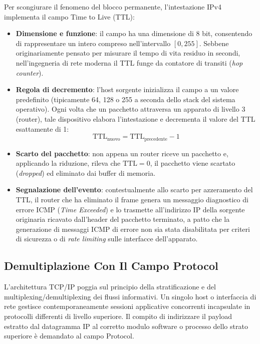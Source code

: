 \documentclass[11pt, a4paper]{article}
\begin{document}
Per scongiurare il fenomeno del blocco permanente, l'intestazione IPv4 implementa il campo Time to Live (TTL):
\begin{itemize}
    \item \textbf{Dimensione e funzione}: il campo ha una dimensione di 8 bit, consentendo di rappresentare un intero compreso nell'intervallo $[0, 255]$. Sebbene originariamente pensato per misurare il tempo di vita residuo in secondi, nell'ingegneria di rete moderna il TTL funge da contatore di transiti (\emph{hop counter}).
    \item \textbf{Regola di decremento}: l'host sorgente inizializza il campo a un valore predefinito (tipicamente 64, 128 o 255 a seconda dello stack del sistema operativo). Ogni volta che un pacchetto attraversa un apparato di livello 3 (router), tale dispositivo elabora l'intestazione e decrementa il valore del TTL esattamente di 1:
    \[
    \text{TTL}_{\text{nuovo}} = \text{TTL}_{\text{precedente}} - 1
    \]
    \item \textbf{Scarto del pacchetto}: non appena un router riceve un pacchetto e, applicando la riduzione, rileva che $\text{TTL} = 0$, il pacchetto viene scartato (\emph{dropped}) ed eliminato dai buffer di memoria.
    \item \textbf{Segnalazione dell'evento}: contestualmente allo scarto per azzeramento del TTL, il router che ha eliminato il frame genera un messaggio diagnostico di errore ICMP (\emph{Time Exceeded}) e lo trasmette all'indirizzo IP della sorgente originaria ricavato dall'header del pacchetto terminato, a patto che la generazione di messaggi ICMP di errore non sia stata disabilitata per criteri di sicurezza o di \emph{rate limiting} sulle interfacce dell'apparato.
\end{itemize}

\subsection{Demultiplazione Con Il Campo Protocol}
L'architettura TCP/IP poggia sul principio della stratificazione e del multiplexing/demultiplexing dei flussi informativi. Un singolo host o interfaccia di rete gestisce contemporaneamente sessioni applicative concorrenti incapsulate in protocolli differenti di livello superiore. Il compito di indirizzare il payload estratto dal datagramma IP al corretto modulo software o processo dello strato superiore è demandato al campo Protocol.

\end{document}
